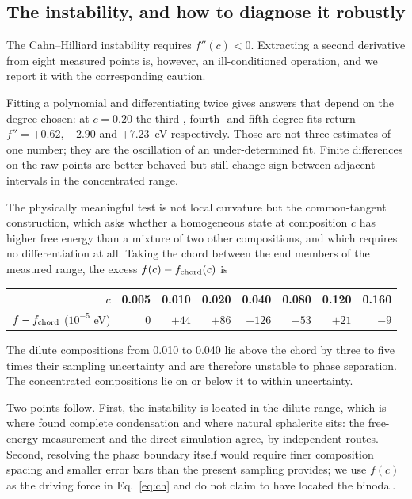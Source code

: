 \documentclass[preprint,12pt,authoryear]{elsarticle}
\begin{document}
\subsection{The instability, and how to diagnose it robustly}
\label{sec:spinodal}

The Cahn--Hilliard instability requires $f''(c) < 0$. Extracting a second
derivative from eight measured points is, however, an ill-conditioned operation,
and we report it with the corresponding caution.

Fitting a polynomial and differentiating twice gives answers that depend on the
degree chosen: at $c = 0.20$ the third-, fourth- and fifth-degree fits return
$f'' = +0.62$, $-2.90$ and $+7.23$~eV respectively. Those are not three
estimates of one number; they are the oscillation of an under-determined fit.
Finite differences on the raw points are better behaved but still change sign
between adjacent intervals in the concentrated range.

The physically meaningful test is not local curvature but the common-tangent
construction, which asks whether a homogeneous state at composition $c$ has
higher free energy than a mixture of two other compositions, and which requires
no differentiation at all. Taking the chord between the end members of the
measured range, the excess $f(c) - f_{\rm chord}(c)$ is
\begin{center}
\small
\begin{tabular}{rrrrrrrr}
\toprule
$c$ & 0.005 & 0.010 & 0.020 & 0.040 & 0.080 & 0.120 & 0.160 \\
\midrule
$f - f_{\rm chord}$ ($10^{-5}$ eV) & $0$ & $+44$ & $+86$ & $+126$ & $-53$ & $+21$ & $-9$ \\
\bottomrule
\end{tabular}
\end{center}
The dilute compositions from 0.010 to 0.040 lie above the chord by three to
five times their sampling uncertainty and are therefore unstable to phase
separation. The concentrated compositions lie on or below it to within
uncertainty.

Two points follow. First, the instability is located in the dilute range,
which is where \citet{yu2026b} found complete condensation and where natural
sphalerite sits: the free-energy measurement and the direct simulation agree,
by independent routes. Second, resolving the phase boundary itself would require
finer composition spacing and smaller error bars than the present sampling
provides; we use $f(c)$ as the driving force in Eq.~\eqref{eq:ch} and do not
claim to have located the binodal.
\end{document}
